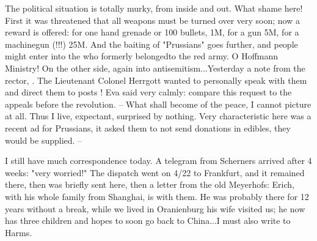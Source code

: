 The political situation is totally murky, from inside and out. What shame here! First it was threatened that all weapons must be turned over very soon; now a reward is offered: for one hand grenade or 100 bullets, 1M, for a gun 5M, for a machinegun (!!!) 25M. And the baiting of "Prussians" goes further, and people might enter into the  who formerly belongedto the red army. O Hoffmann Ministry! On the other side, again into antisemitism...Yesterday a note from the rector, . The Lieutenant Colonel Herrgott wanted to personally speak with them and direct them to posts ! Eva said very calmly: compare this request to the appeals before the revolution. -- What shall become of the peace, I cannot picture at all. Thus I live, expectant, surprised by nothing. Very characteristic here was a recent ad for Prussians, it asked them to not send donations in edibles, they would be supplied. --

I still have much correspondence today. A telegram from Scherners arrived after 4 weeks: "very worried!"  The dispatch went on 4/22 to Frankfurt, and it remained there, then was briefly sent here, then a letter from the old Meyerhofs: Erich, with his whole family from Shanghai, is with them. He was probably there for 12 years without a break, while we lived in Oranienburg his wife visited us; he now has three children and hopes to soon go back to China...I must also write to Harms. \missing
